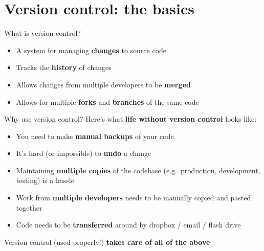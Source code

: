\part{Version control: the basics}
\frame{\partpage}

\begin{frame}{What is version control?}
    \begin{itemize}
        \item A system for managing \textbf{changes} to source code \pause
        \item Tracks the \textbf{history} of changes \pause
        \item Allows changes from multiple developers to be \textbf{merged} \pause
        \item Allows for multiple \textbf{forks} and \textbf{branches} of the same code
    \end{itemize}
\end{frame}

\begin{frame}{Why use version control?}
    Here's what \textbf{life without version control} looks like: \pause
    \begin{itemize}
        \item You need to make \textbf{manual backups} of your code \pause
        \item It's hard (or impossible) to \textbf{undo} a change \pause
        \item Maintaining \textbf{multiple copies} of the codebase (e.g.\ production, development, testing)
            is a hassle \pause
        \item Work from \textbf{multiple developers} needs to be manually copied and pasted together \pause
        \item Code needs to be \textbf{transferred} around by dropbox / email / flash drive \pause
    \end{itemize}
    Version control (used properly!) \textbf{takes care of all of the above}
\end{frame}

